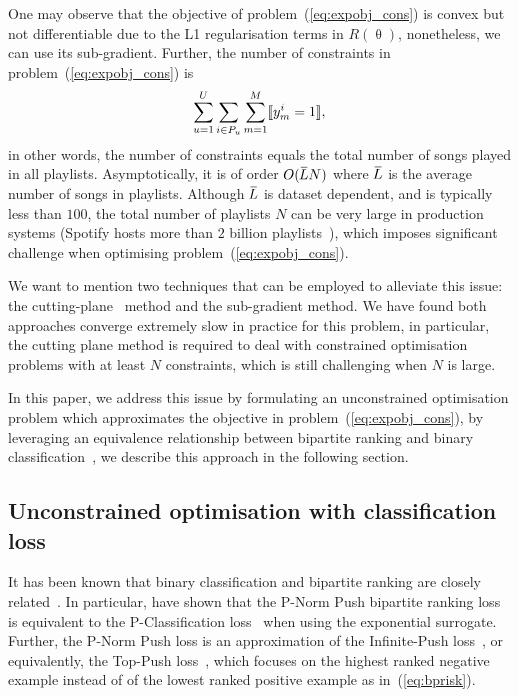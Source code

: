 One may observe that the objective of problem~(\ref{eq:expobj_cons}) is convex but not differentiable due to 
the L1 regularisation terms in $R(\uptheta)$, nonetheless, we can use its sub-gradient.
Further, the number of constraints in problem~(\ref{eq:expobj_cons}) is
$$
\sum_{u=1}^U \sum_{i \in P_u} \sum_{m=1}^M \llbracket y_m^i = 1 \rrbracket,
$$
in other words, the number of constraints equals the total number of songs played in all playlists.
Asymptotically, it is of order $O(\widebar{L} N)$ where $\widebar{L}$ is the average number of songs in playlists.
Although $\widebar{L}$ is dataset dependent, and is typically less than $100$,
the total number of playlists $N$ can be very large in production systems 
(\eg Spotify hosts more than $2$ billion playlists~\cite{recsysch2018}),
which imposes significant challenge when optimising problem~(\ref{eq:expobj_cons}).

We want to mention two techniques that can be employed to alleviate this issue:
the cutting-plane~\cite{avriel2003nonlinear} method and the sub-gradient method.
We have found both approaches converge extremely slow in practice for this problem, 
in particular, the cutting plane method is required to deal with constrained optimisation problems 
with at least $N$ constraints, which is still challenging when $N$ is large.

In this paper, we address this issue by formulating an unconstrained optimisation problem which approximates 
the objective in problem~(\ref{eq:expobj_cons}), by leveraging an equivalence relationship between bipartite 
ranking and binary classification~\cite{ertekin2011equivalence}, we describe this approach in the following section.




\subsection{Unconstrained optimisation with classification loss}

It has been known that binary classification and bipartite ranking are
closely related~\cite{ertekin2011equivalence,menon2016bipartite}.
In particular, \citet{ertekin2011equivalence} have shown that the P-Norm Push bipartite ranking loss~\cite{rudin2009p}
is equivalent to the P-Classification loss~\cite{ertekin2011equivalence} when using the exponential surrogate.
Further, the P-Norm Push loss is an approximation of the Infinite-Push loss~\cite{agarwal2011infinite},
or equivalently, the Top-Push loss~\cite{li2014top}, which focuses on the highest ranked negative example instead of
of the lowest ranked positive example as in~(\ref{eq:bprisk}).

